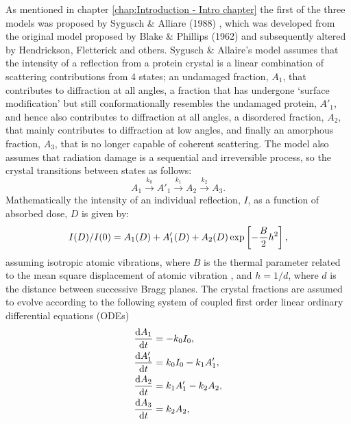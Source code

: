 As mentioned in chapter \ref{chap:Introduction - Intro chapter} the first of the three models was proposed by Sygusch \& Alliare (1988) \cite{sygusch1988}, which was developed from the original model proposed by Blake \& Phillips (1962) \cite{blake1962} and subsequently altered by Hendrickson, Fletterick and others.
Sygusch \& Allaire's model assumes that the intensity of a reflection from a protein crystal is a linear combination of scattering contributions from 4 states; an undamaged fraction, $A_1$, that contributes to diffraction at all angles, a fraction that has undergone `surface modification' but still conformationally resembles the undamaged protein, $A'_1$, and hence also contributes to diffraction at all angles, a disordered fraction, $A_2$, that mainly contributes to diffraction at low angles, and finally an amorphous fraction, $A_3$, that is no longer capable of coherent scattering.
The model also assumes that radiation damage is a sequential and irreversible process, so the crystal transitions between states as follows:
\begin{equation}
	A_1 \xrightarrow{k_0} A'_1 \xrightarrow{k_1} A_2 \xrightarrow{k_2} A_3.
\end{equation}
Mathematically the intensity of an individual reflection, $I$, as a function of absorbed dose, $D$ is given by:
\begin{equation}
I(D)/I(0) = A_1(D) + A'_1(D) + A_2(D) \exp \left[ -\frac{B}{2}h^2\right],
\label{eq: Sygusch and Allaire DDM}
\end{equation}
assuming isotropic atomic vibrations, where $B$ is the thermal parameter related to the mean square displacement of atomic vibration \cite{drenth1999}, and $h = 1/d$, where $d$ is the distance between successive Bragg planes.
\newline
The crystal fractions are assumed to evolve according to the following system of coupled first order linear ordinary differential equations (ODEs)
\begin{subequations}
	\begin{align}
		\frac{\mathrm{d}A_1}{\mathrm{d}t}  &= - k_0 I_0,                        \\
		\frac{\mathrm{d}A'_1}{\mathrm{d}t} &=   k_0 I_0  - k_1 A'_1,            \\
		\frac{\mathrm{d}A_2}{\mathrm{d}t}  &=              k_1 A'_1  - k_2 A_2, \\
		\frac{\mathrm{d}A_3}{\mathrm{d}t}  &=                          k_2 A_2,
	\end{align}
\label{eq:ODE system Syg and All}
\end{subequations}
